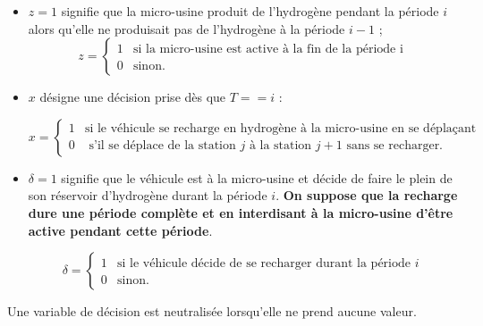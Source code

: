 \begin{itemize}[label=$\square$]
	\item $z=1 $ signifie que la micro-usine produit de l'hydrogène pendant la période $i$ alors qu'elle ne produisait pas de l'hydrogène à la période $i-1$ ;
	$$
	z= \left\{
	\begin{array}{ll}
	1 & \mbox{si la micro-usine est active à la fin de la période i} \\
	0 & \mbox{sinon.}
	\end{array}
	\right.
	$$
	\item $x$ désigne une décision prise dès que $T == i$ : 
	
	$$
	x= \left\{
	\begin{array}{ll}
	1 & \mbox{si le véhicule se recharge en hydrogène à la micro-usine en se déplaçant de j à j + 1.} \\
	0 & \mbox{ s'il se déplace de la station $j$ à la station $j + 1$ sans se recharger.}
	\end{array}
	\right.
	$$
	
	\item $\delta=1 $ signifie que le véhicule est à la micro-usine et décide de faire le plein de son réservoir d'hydrogène durant la période $i$. \textbf{On suppose que la recharge dure une période complète et en interdisant à la micro-usine d'être active pendant cette période}.
	
	
	$$
	\delta= \left\{
	\begin{array}{ll}
	1 & \mbox{si le véhicule décide de se recharger durant la période $i$} \\
	0 & \mbox{sinon.}
	\end{array}
	\right.
	$$
	
\end{itemize}
\begin{Def}
	Une variable de décision est neutralisée lorsqu'elle ne prend aucune valeur.
\end{Def}
